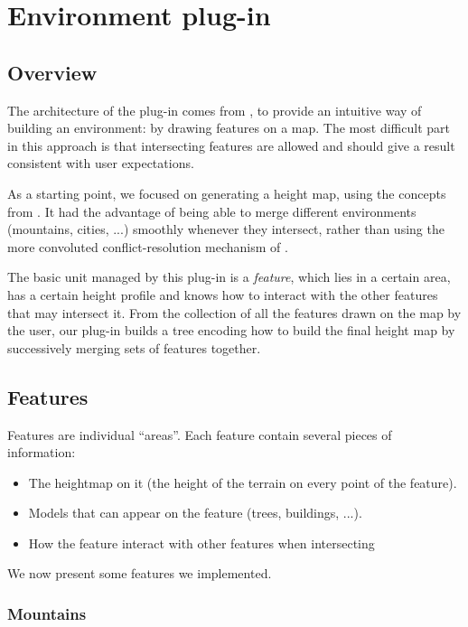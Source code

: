 \section{Environment plug-in}

\subsection{Overview}

The architecture of the plug-in comes from
\cite{DeclarativeArchitecture}, to provide an intuitive way of
building an environment: by drawing features on a map. The most
difficult part in this approach is that intersecting features are
allowed and should give a result consistent with user expectations.

As a starting point, we focused on generating a height map, using the
concepts from \cite{FeatureTree}. It had the advantage of being able
to merge different environments (mountains, cities, ...) smoothly whenever they intersect, rather than using
the more convoluted conflict-resolution mechanism of
\cite{DeclarativeArchitecture}.

\bigskip

The basic unit managed by this plug-in is a \emph{feature}, which lies
in a certain area, has a certain height profile and knows how to
interact with the other features that may intersect it. From the
collection of all the features drawn on the map by the user, our
plug-in builds a tree encoding how to build the final height map by
successively merging sets of features together.  %



\subsection{Features}
Features are individual ``areas''. Each feature contain several pieces of information:
\begin{itemize}
  \item The heightmap on it (the height of the terrain on every point of the feature).
  \item Models that can appear on the feature (trees, buildings, ...).
  \item How the feature interact with other features when intersecting
\end{itemize}
We now present some features we implemented.

\subsubsection{Mountains}

